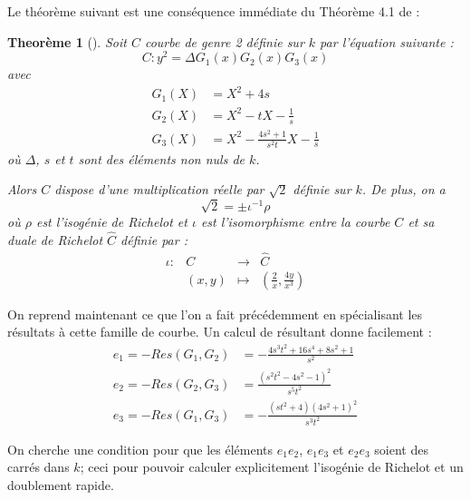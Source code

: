 \documentclass[a4paper,12pt]{article}
\newtheorem{theoreme}{Theorème}[section]
\theoremstyle{definition}
\theoremstyle{remark}
\numberwithin{equation}{section}
\begin{document}
Le théorème suivant est une conséquence immédiate du Théorème 4.1 de \citep{bending} :
\begin{theoreme}[\citet{bending}]
\label{bending}
Soit $C$ courbe de genre 2 définie sur $k$ par l'équation suivante :
$$C : y^2 = \Delta G_1(x)G_2(x)G_3(x)$$
avec
\begin{align*}
G_1(X) &= X^2 + 4s \\
G_2(X) &= X^2 - tX - \frac{1}{s} \\
G_3(X) &= X^2 - \frac{4s^2+1}{s^2t}X - \frac{1}{s}
\end{align*}
où $\Delta$, $s$ et $t$ sont des éléments non nuls de $k$.

Alors $C$ dispose d'une multiplication réelle par $\sqrt2$ définie sur $k$. De plus, on a
$$\sqrt{2} = \pm \iota^{-1}\rho$$
où $\rho$ est l'isogénie de Richelot et $\iota$ est l'isomorphisme entre la courbe $C$ et sa duale de Richelot $\hat{C}$ définie par :
\begin{equation*}
\begin{array}{lrcl}
\iota :&C & \longrightarrow & \hat{C} \\
& (x,y) & \longmapsto & (\frac{2}{x},\frac{4y}{x^3})
\end{array}
\end{equation*}
%
\end{theoreme}

On reprend maintenant ce que l'on a fait précédemment en spécialisant les résultats à cette famille de courbe. Un calcul de résultant donne facilement :
\begin{align*}
e_1 = -Res(G_1,G_2) &= -\frac{4s^3t^2 + 16s^4 + 8s^2 + 1}{s^2} \\
e_2 = -Res(G_2,G_3) &= \frac{(s^2t^2 - 4s^2 - 1)^2}{s^5t^2} \\
e_3 = -Res(G_1,G_3) &= -\frac{(st^2 + 4)(4s^2 + 1)^2}{s^3t^2}
\end{align*}

On cherche une condition pour que les éléments $e_1e_2$, $e_1e_3$ et $e_2e_3$ soient des carrés dans $k$; ceci pour pouvoir calculer explicitement l'isogénie de Richelot et un doublement rapide.
\end{document}
